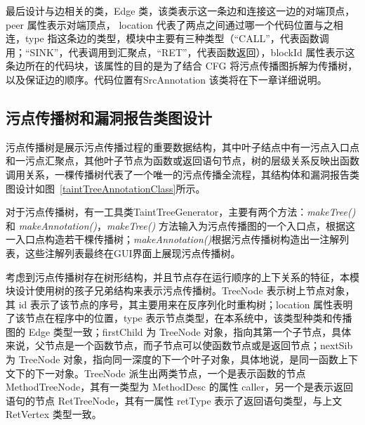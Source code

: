最后设计与边相关的类，Edge 类，该类表示这一条边和连接这一边的对端顶点，peer 属性表示对端顶点， location 代表了两点之间通过哪一个代码位置与之相连，type 指这条边的类型，模块中主要有三种类型（“CALL”，代表函数调用；“SINK”，代表调用到汇聚点，“RET”，代表函数返回），blockId 属性表示这条边所在的代码块，该属性的目的是为了结合 CFG 将污点传播图拆解为传播树，以及保证边的顺序。代码位置有SrcAnnotation 该类将在下一章详细说明。\\


\subsection{污点传播树和漏洞报告类图设计}

污点传播树是展示污点传播过程的重要数据结构，其中叶子结点中有一污点入口点和一污点汇聚点，其他叶子节点为函数或返回语句节点，树的层级关系反映出函数调用关系，一棵传播树代表了一个唯一的污点传播全流程，其结构体和漏洞报告类图设计如图~\ref{taintTreeAnnotationClass}所示。

对于污点传播树，有一工具类TaintTreeGenerator，主要有两个方法：\textit{makeTree()} 和 \textit{makeAnnotation()}，\textit{makeTree()} 方法输入为污点传播图的一个入口点，根据这一入口点构造若干棵传播树；\textit{makeAnnotation()}根据污点传播树构造出一注解列表，这些注解列表最终在GUI界面上展现污点传播树。

考虑到污点传播树存在树形结构，并且节点存在运行顺序的上下关系的特征，本模块设计使用树的孩子兄弟结构来表示污点传播树。TreeNode 表示树上节点对象，其 id 表示了该节点的序号，其主要用来在反序列化时重构树；location 属性表明了该节点在程序中的位置，type 表示节点类型，在本系统中，该类型种类和传播图的 Edge 类型一致；firstChild 为 TreeNode 对象，指向其第一个子节点，具体来说，父节点是一个函数节点，而子节点可以使函数节点或是返回节点；nextSib 为 TreeNode 对象，指向同一深度的下一个叶子对象，具体地说，是同一函数上下文下的下一对象。TreeNode 派生出两类节点，一个是表示函数的节点 MethodTreeNode，其有一类型为 MethodDesc 的属性 caller，另一个是表示返回语句的节点 RetTreeNode，其有一属性 retType 表示了返回语句类型，与上文 RetVertex 类型一致。

